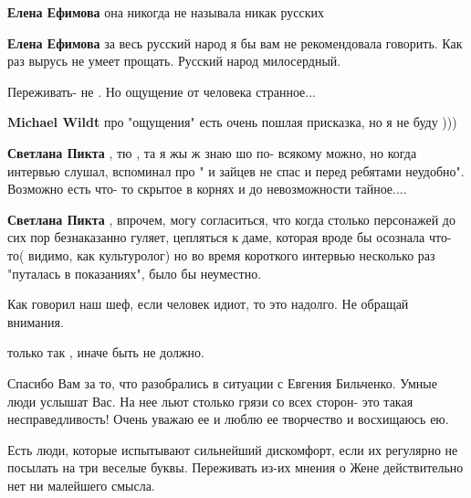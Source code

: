 \begin{itemize}
\begin{itemize} %
\textbf{Елена Ефимова} она никогда не называла никак русских
\end{itemize} %

\textbf{Елена Ефимова} за весь русский народ я бы вам не рекомендовала говорить. Как раз вырусь не умеет прощать. Русский народ милосердный.

Переживать- не .
Но ощущение от человека странное...

\begin{itemize} %
\textbf{Michael Wildt} про "ощущения" есть очень пошлая присказка, но я не буду )))

\textbf{Светлана Пикта} , тю , та я жы ж знаю шо по- всякому можно, но когда интервью слушал, вспоминал про " и зайцев не спас и перед ребятами неудобно".
Возможно есть что- то скрытое в корнях и до невозможности тайное....

\textbf{Светлана Пикта} , впрочем, могу согласиться, что когда столько персонажей до сих пор безнаказанно гуляет, цепляться к даме, которая вроде бы осознала что-то( видимо, как культуролог) но во время короткого интервью несколько раз "путалась в показаниях", было бы неуместно.
\end{itemize} %

Как говорил наш шеф, если человек идиот, то это надолго. Не обращай внимания.

только так , иначе быть не должно.


Спасибо Вам за то, что разобрались в ситуации с Евгения Бильченко. Умные люди
услышат Вас. На нее льют столько грязи со всех сторон- это такая
несправедливость! Очень уважаю ее и люблю ее творчество и восхищаюсь ею.



Есть люди, которые испытывают сильнейший дискомфорт, если их регулярно не
посылать на три веселые буквы. Переживать из-их мнения о Жене действительно нет
ни малейшего смысла.



\end{itemize}
